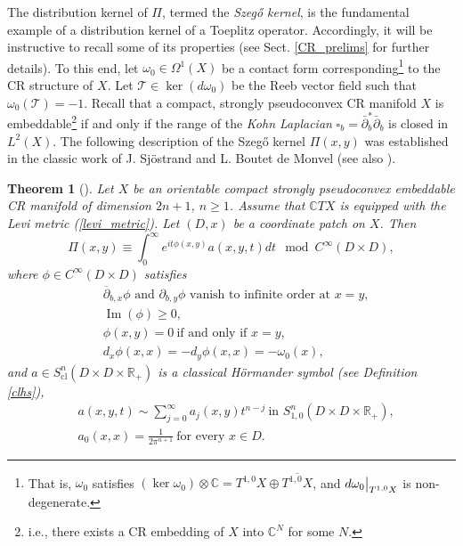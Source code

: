 \documentclass{article}
\newtheorem{theorem}{Theorem}[section]
\newcommand{\CC}{\mathbb C}
\newcommand{\RR}{\mathbb R}
\newcommand{\mct}{\mathcal T}
\DeclareMathOperator{\im}{Im}
\DeclareMathOperator{\cl}{cl}
\begin{document}
The distribution kernel of $\Pi$, termed the \textit{Szeg\H{o} kernel}, is the fundamental example of a distribution kernel of a Toeplitz operator. Accordingly, it will be instructive to recall some of its properties (see Sect. \ref{CR_prelims} for further details). To this end, let $\omega_0 \in \Omega^1(X)$ be a contact form corresponding\footnote{That is, $\omega_0$ satisfies $(\ker \omega_0) \otimes \CC = T^{1,0} X \oplus \overline{T^{1,0}X}$, and $d\omega_0 \big{|}_{T^{1,0}X}$ is non-degenerate.} to the CR structure of $X$. Let $\mct \in \ker(d\omega_0)$ be the Reeb vector field such that $\omega_0(\mct) = -1$. 
Recall that a compact, strongly pseudoconvex CR manifold $X$ is embeddable\footnote{i.e., there exists a CR embedding of $X$ into $\CC^N$ for some $N$.} if and only if the range of the \textit{Kohn Laplacian} $\square_b = \bar \partial_b^* \bar \partial_b$
is closed in $L^2(X)$. The following description of the Szeg\H{o} kernel $\Pi(x,y)$ was established in the classic work \cite{bdms} of J. Sj\"{o}strand and L. Boutet de Monvel (see also \cite{hsiao1, hsiaomari2}).
%
%
%
\begin{theorem}[\cite{bdms}]\label{bdms_thm} Let $X$ be an orientable compact strongly pseudoconvex embeddable CR manifold of dimension $2n+1$, $n \ge 1$. Assume that $\CC TX$ is equipped with the \textit{Levi metric} (\ref{levi_metric}). Let $(D,x)$ be a coordinate patch on $X$. Then
\begin{equation}\label{szego_ker} \Pi(x,y) \equiv \int_0^\infty e^{i t \phi(x,y)} a(x,y,t)dt \mod C^\infty(D \times D),\end{equation}
where $\phi \in C^\infty(D \times D)$ satisfies
\begin{equation}\label{phi_props} \begin{aligned} 
&\mbox{$\overline{\partial}_{b,x}\phi$ and 
$\partial_{b,y}\phi$ vanish to infinite order at $x=y$},\\
& \im(\phi) \ge 0,\\ & \phi(x,y) = 0 \ \text{if and only if }x=y,\\ & d_x\phi(x,x) = - d_y \phi(x,x) = -\omega_0(x),\end{aligned} \end{equation}
and $a\in S^n_{\cl}(D \times D \times \RR_+)$ is a \textit{classical H\"{o}rmander symbol} (see Definition \ref{clhs}),
\begin{equation}\label{a_props}
\begin{aligned} &a(x,y,t) \sim \sum_{j=0}^\infty a_j(x,y)t^{n-j}\ \text{in } S^n_{1,0}(D \times D \times \RR_+),\\ & a_0(x,x) = \frac 1 {2\pi^{n+1}}  \ \text{for every }x \in D.\end{aligned}\end{equation}\end{theorem}
\end{document}
